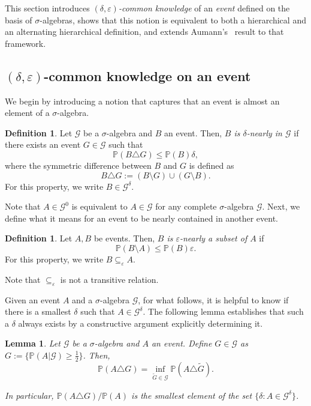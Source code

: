 \documentclass[a4paper, 10pt]{article}
\numberwithin{theorem}{section}
\newtheorem{lemma}[theorem]{Lemma}
\theoremstyle{definition}
\newtheorem{definition}[theorem]{Definition}
\newcommand{\G}{\mathcal{G}}
\renewcommand{\epsilon}{\varepsilon}
\renewcommand{\P}{\mathbb{P}}
\begin{document}
  This section introduces \emph{$(\delta,\epsilon)$-common knowledge} of an \emph{event} defined on the basis of $\sigma$-algebras, shows that this notion is equivalent to both a hierarchical and an alternating hierarchical definition, and extends Aumann's~\cite{Au76} result to that framework.

\boldmath
\subsection{$(\delta,\epsilon)$-common knowledge on an event}
\unboldmath
 
We begin by introducing a notion that captures that an event is almost an element of a $\sigma$-algebra.

\begin{definition}
	Let $\G$ be a $\sigma$-algebra and $B$ an event. Then, \emph{$B$ is $\delta$-nearly in $\G$} if there exists an event $G \in \G$ such that  $$ \P(B \triangle G)\leq  \P(B) \delta,$$
	where the symmetric difference between $B$ and $G$ is defined as
	$$B\triangle G := (B\setminus G) \cup (G \setminus B) .$$
	For this property, we write $B \in \G^\delta$.
\end{definition}

Note that  $A \in \G^0$ is equivalent to $A \in \G$ for any complete $\sigma$-algebra $\G$. Next, we define what it means for an event to be nearly contained in another event.

\begin{definition}	
	Let $A,B$ be events. Then, \emph{$B$ is $\epsilon$-nearly a subset of $A$} if $$\P(B\setminus A) \leq \P(B)\epsilon.$$
	For this property, we write $B \subseteq_\epsilon A$.
\end{definition}

Note that $\subseteq_\epsilon$ is not a transitive relation.

Given an event $A$ and a $\sigma$-algebra $\G$, for what follows, it is helpful to know if there is a smallest $\delta$ such that $A \in \G^\delta$. The following lemma establishes that such a $\delta$ always exists by a constructive argument explicitly determining it.


\begin{lemma}\label{lemma:smallest_delta}
	Let $\G$ be a  $\sigma$-algebra and $A$ an event. Define $G\in \G$ as $G:=\{\P(A|\G) \geq \frac{1}{2}\}$. Then, 
	$$\P(A \triangle G) = \inf_{\tilde{G} \in \G} \P(A \triangle \tilde{G} ).$$
	 
	 In particular, $\P(A \triangle G)/\P(A)$ is the smallest element of the set $\{\delta : A \in \G^\delta\}$.
\end{lemma}
\end{document}
